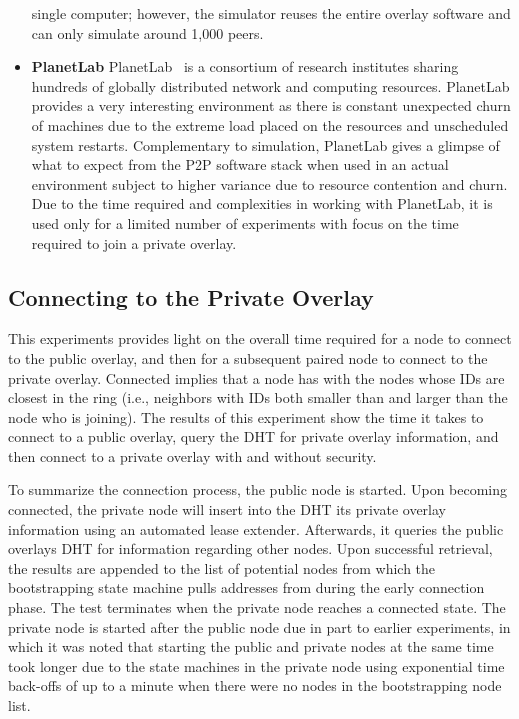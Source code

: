 \begin{itemize}
single computer; however, the simulator reuses the entire overlay software and
can only simulate around 1,000 peers.
\item \textbf{PlanetLab} PlanetLab~\cite{planetlab} is a consortium of research
institutes sharing hundreds of globally distributed network and computing
resources.  PlanetLab provides a very interesting environment as there is
constant unexpected churn of machines due to the extreme load placed on the
resources and unscheduled system restarts.  Complementary to simulation,
PlanetLab gives a glimpse of what to expect from the P2P software stack when
used in an actual environment subject to higher variance due to resource
contention and churn.  Due to the time required and complexities in working with
PlanetLab, it is used only for a limited number of experiments with focus on the
time required to join a private overlay.
\end{itemize}

\subsection{Connecting to the Private Overlay}
This experiments provides light on the overall time required for a node to
connect to the public overlay, and then for a subsequent paired node to connect
to the private overlay.  Connected implies that a node has with the nodes whose
IDs are closest in the ring (i.e., neighbors with IDs both smaller than and
larger than the node who is joining).  The results of this experiment show the
time it takes to connect to a public overlay, query the DHT for private overlay
information, and then connect to a private overlay with and without security.

To summarize the connection process, the public node is started.  Upon becoming
connected, the private node will insert into the DHT its private overlay
information using an automated lease extender.  Afterwards, it queries the
public overlays DHT for information regarding other nodes.  Upon successful
retrieval, the results are appended to the list of potential nodes from which
the bootstrapping state machine pulls addresses from during the early
connection phase.  The test terminates when the private node reaches a
connected state.  The private node is started after the public node due in part
to earlier experiments, in which it was noted that starting the public and
private nodes at the same time took longer due to the state machines in the
private node using exponential time back-offs of up to a minute when there
were no nodes in the bootstrapping node list.

